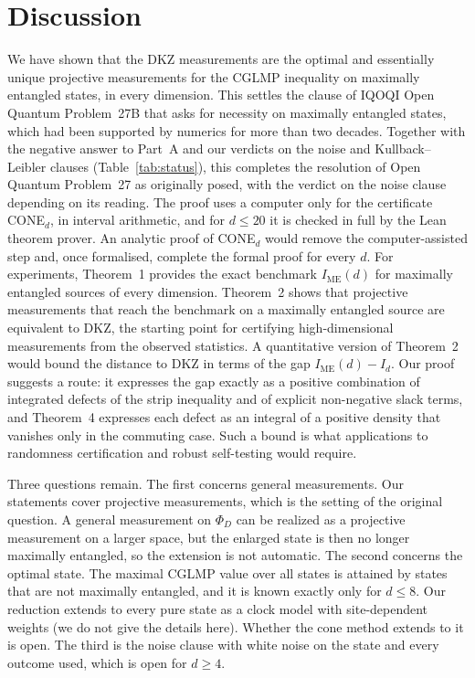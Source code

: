 \documentclass[11pt]{article}
\newcommand{\IME}{I_{\mathrm{ME}}}
\begin{document}
\section*{Discussion}

We have shown that the DKZ measurements are the optimal and essentially unique projective measurements for the CGLMP
inequality on maximally entangled states, in every dimension. This settles the clause of IQOQI Open Quantum Problem~27B
that asks for necessity on maximally entangled states, which had been supported by numerics for more than two decades.
Together with the negative answer to Part~A\cite{BGP2010} and our verdicts on the noise and Kullback--Leibler clauses
(Table~\ref{tab:status}), this completes the resolution of Open Quantum Problem~27 as originally posed, with the verdict
on the noise clause depending on its reading. The proof uses a computer only for the certificate CONE$_d$, in interval arithmetic, and for $d\le20$ it is checked in
full by the Lean theorem prover. An analytic proof of CONE$_d$ would remove the computer-assisted step and, once
formalised, complete the formal proof for every $d$.
For experiments, Theorem~1 provides the exact benchmark $\IME(d)$ for maximally entangled sources of every dimension.
Theorem~2 shows that projective measurements that reach the benchmark on a maximally entangled source are equivalent to
DKZ, the starting point for certifying high-dimensional measurements from the observed statistics. A quantitative
version of Theorem~2 would bound the distance to DKZ in terms of the gap $\IME(d)-I_d$. Our proof suggests a route: it
expresses the gap exactly as a positive combination of integrated defects of the strip inequality and of explicit
non-negative slack terms, and Theorem~4 expresses each defect as an integral of a positive density that vanishes only
in the commuting case. Such a bound is what applications to randomness
certification and robust self-testing would require\cite{SupicBowles2020,Pironio2010}.

Three questions remain. The first concerns general measurements. Our statements cover projective measurements, which
is the setting of the original question. A general measurement on $\Phi_D$ can be realized as a projective measurement
on a larger space, but the enlarged state is then no longer maximally entangled, so the extension is not automatic. The
second concerns the optimal state. The maximal CGLMP value over all states is attained by states that are not maximally
entangled\cite{ADGL2002}, and it is known exactly only for $d\le8$. Our reduction extends to every pure state as a
clock model with site-dependent weights (we do not give the details here). Whether the cone method extends to it is
open. The third is the noise clause with white noise on the state and every outcome used, which is open for $d\ge4$.
\end{document}
